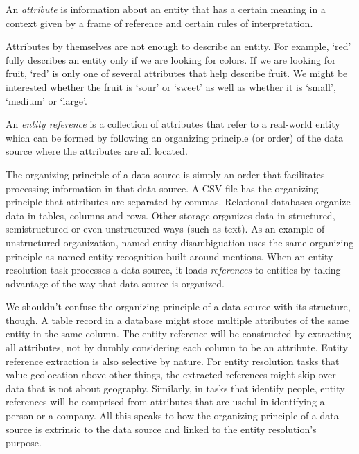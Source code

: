 \documentclass[journal]{IEEEtran}
\begin{document}
    \begin{defn}
        An \textit{attribute} is information about an entity that has a certain
        meaning in a context given by a frame of reference and certain rules of
        interpretation.
    \end{defn}

    Attributes by themselves are not enough to describe an entity.
    For example, `red' fully describes an entity only if we are looking for
    colors.
    If we are looking for fruit, `red' is only one of several attributes that
    help describe fruit.
    We might be interested whether the fruit is `sour' or `sweet' as well as
    whether it is `small', `medium' or `large'.

    \begin{defn}
        An \textit{entity reference} is a collection of attributes that refer
        to a real-world entity which can be formed by following an organizing
        principle (or order) of the data source where the attributes are all
        located.
    \end{defn}

    The organizing principle of a data source is simply an order that
    facilitates processing information in that data source.
    A CSV file has the organizing principle that attributes are separated by
    commas.
    Relational databases organize data in tables, columns and rows.
    Other storage organizes data in structured, semistructured or even
    unstructured ways (such as text).
    As an example of unstructured organization, named entity disambiguation uses
    the same organizing principle as named entity recognition built around
    mentions.
    When an entity resolution task processes a data source, it loads
    \textit{references}\cite{Ben2009Swoosh} to entities by taking advantage of
    the way that data source is organized.

    We shouldn't confuse the organizing principle of a data source with its
    structure, though.
    A table record in a database might store multiple attributes of the same
    entity in the same column.
    The entity reference will be constructed by extracting all attributes, not
    by dumbly considering each column to be an attribute.
    Entity reference extraction is also selective by nature.
    For entity resolution tasks that value geolocation above other things, the
    extracted references might skip over data that is not about geography.
    Similarly, in tasks that identify people, entity references will be
    comprised from attributes that are useful in identifying a person or a
    company.
    All this speaks to how the organizing principle of a data source is
    extrinsic to the data source and linked to the entity resolution's purpose.
\end{document}
